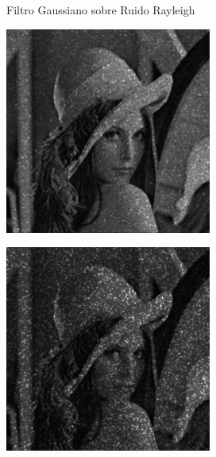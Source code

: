 \documentclass{beamer}
\begin{document}
\begin{frame}[fragile]{Filtro Gaussiano sobre Ruido Rayleigh}
	\begin{minipage}{0.25\linewidth}
		\centering
		\includegraphics[width=\linewidth]{../results/lena_rayleigh_xi1_gaussiano}
	\end{minipage}\hfill
	\begin{minipage}{0.25\linewidth}
		\centering
		\includegraphics[width=\linewidth]{../results/lena_rayleigh_xi2_gaussiano}

\end{minipage}
\end{frame}
\end{document}
